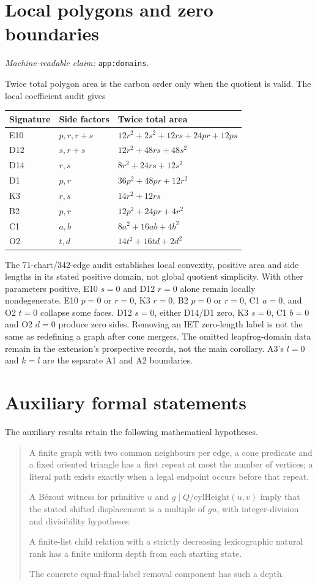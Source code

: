 \documentclass[11pt]{amsart}
\newcommand{\record}[1]{\nolinkurl{#1}}
\newcommand{\claimid}[1]{\par\nopagebreak\noindent\textit{Machine-readable claim:} \record{#1}.\par}
\theoremstyle{definition}\newtheorem{definition}{Definition}
\begin{document}
\appendix
\section{Local polygons and zero boundaries}\label{app:domains}
\claimid{app:domains}
Twice total polygon area is the carbon order only when the quotient
is valid. The local coefficient audit gives
\begin{center}\small
\begin{tabular}{lll}\toprule
Signature & Side factors & Twice total area\\\midrule
E10 & $p,r,r+s$ & $12r^2+2s^2+12rs+24pr+12ps$\\
D12 & $s,r+s$ & $12r^2+48rs+48s^2$\\
D14 & $r,s$ & $8r^2+24rs+12s^2$\\
D1 & $p,r$ & $36p^2+48pr+12r^2$\\
K3 & $r,s$ & $14r^2+12rs$\\
B2 & $p,r$ & $12p^2+24pr+4r^2$\\
C1 & $a,b$ & $8a^2+16ab+4b^2$\\
O2 & $t,d$ & $14t^2+16td+2d^2$\\\bottomrule
\end{tabular}
\end{center}
The 71-chart/342-edge audit establishes local convexity, positive area
and side lengths in its stated positive domain, not global quotient
simplicity. With other parameters positive, E10 $s=0$ and D12 $r=0$
alone remain locally nondegenerate. E10 $p=0$ or $r=0$, K3 $r=0$,
B2 $p=0$ or $r=0$, C1 $a=0$, and O2 $t=0$ collapse some faces.
D12 $s=0$, either D14/D1 zero, K3 $s=0$, C1 $b=0$ and O2 $d=0$
produce zero sides. Removing an IET zero-length label is not the same
as redefining a graph after cone mergers. The omitted leapfrog-domain
data remain in the extension's prospective records, not the main
corollary. A3's $l=0$ and $k=l$ are the separate A1 and A2 boundaries.

\section{Auxiliary formal statements}\label{app:correspondence}
The auxiliary results retain the following mathematical hypotheses.
\begin{quote}\small
A finite graph with two common neighbours per edge, a cone predicate
and a fixed oriented triangle has a first repeat at most the number
of vertices; a literal path exists exactly when a legal endpoint
occurs before that repeat.\par
A B\'ezout witness for primitive $u$ and
$g\mid Q/\mathrm{cylHeight}(u,v)$ imply that the stated shifted
displacement is a multiple of $gu$, with integer-division and
divisibility hypotheses.\par
A finite-list child relation with a strictly decreasing lexicographic
natural rank has a finite uniform depth from each starting state.\par
The concrete equal-final-label removal component has such a depth.
\end{quote}
\end{document}
